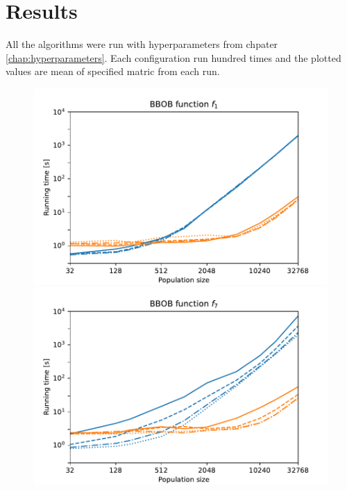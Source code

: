 \chapter{Results}

All the algorithms were run with hyperparameters from chpater \ref{chap:hyperparameters}. Each configuration run hundred times and the plotted values are mean of specified matric from each run.



\begin{figure}[ht!]
    \centering
    \begin{minipage}[t]{0.32\textwidth}
        \centering
        \includegraphics[width=\textwidth]{img/runs/time_pso2006_fn1_alldim.pdf}
    \end{minipage}
    \hfill
    \begin{minipage}[t]{0.32\textwidth}
        \centering
        \includegraphics[width=\textwidth]{img/runs/time_pso2006_fn7_alldim.pdf}

\end{minipage}
\end{figure}
